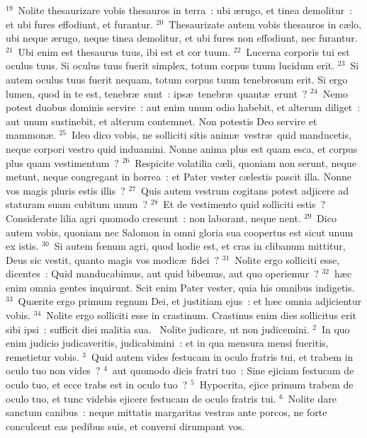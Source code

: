 ${}^{19}$~Nolite thesaurizare vobis thesauros in terra~: ubi \ae rugo, et tinea demolitur~: et ubi fures effodiunt, et furantur.
${}^{20}$~Thesaurizate autem vobis thesauros in c\ae lo, ubi neque \ae rugo, neque tinea demolitur, et ubi fures non effodiunt, nec furantur.
${}^{21}$~Ubi enim est thesaurus tuus, ibi est et cor tuum.
${}^{22}$~Lucerna corporis tui est oculus tuus. Si oculus tuus fuerit simplex, totum corpus tuum lucidum erit.
${}^{23}$~Si autem oculus tuus fuerit nequam, totum corpus tuum tenebrosum erit. Si ergo lumen, quod in te est, tenebr\ae\ sunt~: ips\ae\ tenebr\ae\ quant\ae\ erunt~?
${}^{24}$~Nemo potest duobus dominis servire~: aut enim unum odio habebit, et alterum diliget~: aut unum sustinebit, et alterum contemnet. Non potestis Deo servire et mammon\ae .
${}^{25}$~Ideo dico vobis, ne solliciti sitis anim\ae\ vestr\ae\ quid manducetis, neque corpori vestro quid induamini. Nonne anima plus est quam esca, et corpus plus quam vestimentum~?
${}^{26}$~Respicite volatilia c\ae li, quoniam non serunt, neque metunt, neque congregant in horrea~: et Pater vester c\ae lestis pascit illa. Nonne vos magis pluris estis illis~?
${}^{27}$~Quis autem vestrum cogitans potest adjicere ad staturam suam cubitum unum~?
${}^{28}$~Et de vestimento quid solliciti estis~? Considerate lilia agri quomodo crescunt~: non laborant, neque nent.
${}^{29}$~Dico autem vobis, quoniam nec Salomon in omni gloria sua coopertus est sicut unum ex istis.
${}^{30}$~Si autem fœnum agri, quod hodie est, et cras in clibanum mittitur, Deus sic vestit, quanto magis vos modic\ae\ fidei~?
${}^{31}$~Nolite ergo solliciti esse, dicentes~: Quid manducabimus, aut quid bibemus, aut quo operiemur~?
${}^{32}$~h\ae c enim omnia gentes inquirunt. Scit enim Pater vester, quia his omnibus indigetis.
${}^{33}$~Qu\ae rite ergo primum regnum Dei, et justitiam ejus~: et h\ae c omnia adjicientur vobis.
${}^{34}$~Nolite ergo solliciti esse in crastinum. Crastinus enim dies sollicitus erit sibi ipsi~: sufficit diei malitia sua.
~Nolite judicare, ut non judicemini.
${}^{2}$~In quo enim judicio judicaveritis, judicabimini~: et in qua mensura mensi fueritis, remetietur vobis.
${}^{3}$~Quid autem vides festucam in oculo fratris tui, et trabem in oculo tuo non vides~?
${}^{4}$~aut quomodo dicis fratri tuo~: Sine ejiciam festucam de oculo tuo, et ecce trabs est in oculo tuo~?
${}^{5}$~Hypocrita, ejice primum trabem de oculo tuo, et tunc videbis ejicere festucam de oculo fratris tui.
${}^{6}$~Nolite dare sanctum canibus~: neque mittatis margaritas vestras ante porcos, ne forte conculcent eas pedibus suis, et conversi dirumpant vos.


